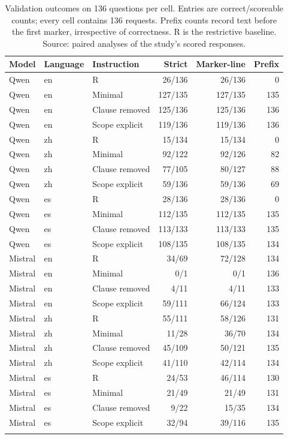 \begin{table}[!htbp]\centering\small
\caption{Validation outcomes on 136 questions per cell. Entries are correct/scoreable counts; every cell contains 136 requests. Prefix counts record text before the first marker, irrespective of correctness. R is the restrictive baseline. Source: paired analyses of the study's scored responses.}
\label{tab:validation_cells}
\begin{tabular}{@{}lllrrr@{}}\toprule
Model & Language & Instruction & Strict & Marker-line & Prefix \\\midrule
Qwen & en & R & 26/136 & 26/136 & 0 \\
Qwen & en & Minimal & 127/135 & 127/135 & 135 \\
Qwen & en & Clause removed & 125/136 & 125/136 & 136 \\
Qwen & en & Scope explicit & 119/136 & 119/136 & 136 \\
\addlinespace
Qwen & zh & R & 15/134 & 15/134 & 0 \\
Qwen & zh & Minimal & 92/122 & 92/126 & 82 \\
Qwen & zh & Clause removed & 77/105 & 80/127 & 88 \\
Qwen & zh & Scope explicit & 59/136 & 59/136 & 69 \\
\addlinespace
Qwen & es & R & 28/136 & 28/136 & 0 \\
Qwen & es & Minimal & 112/135 & 112/135 & 135 \\
Qwen & es & Clause removed & 113/133 & 113/133 & 135 \\
Qwen & es & Scope explicit & 108/135 & 108/135 & 134 \\
\addlinespace
Mistral & en & R & 34/69 & 72/128 & 134 \\
Mistral & en & Minimal & 0/1 & 0/1 & 136 \\
Mistral & en & Clause removed & 4/11 & 4/11 & 133 \\
Mistral & en & Scope explicit & 59/111 & 66/124 & 133 \\
\addlinespace
Mistral & zh & R & 55/111 & 58/126 & 131 \\
Mistral & zh & Minimal & 11/28 & 36/70 & 134 \\
Mistral & zh & Clause removed & 45/109 & 50/121 & 135 \\
Mistral & zh & Scope explicit & 41/110 & 42/114 & 134 \\
\addlinespace
Mistral & es & R & 24/53 & 46/114 & 130 \\
Mistral & es & Minimal & 21/49 & 21/49 & 131 \\
Mistral & es & Clause removed & 9/22 & 15/35 & 134 \\
Mistral & es & Scope explicit & 32/94 & 39/116 & 135 \\
\addlinespace
\bottomrule\end{tabular}\end{table}
